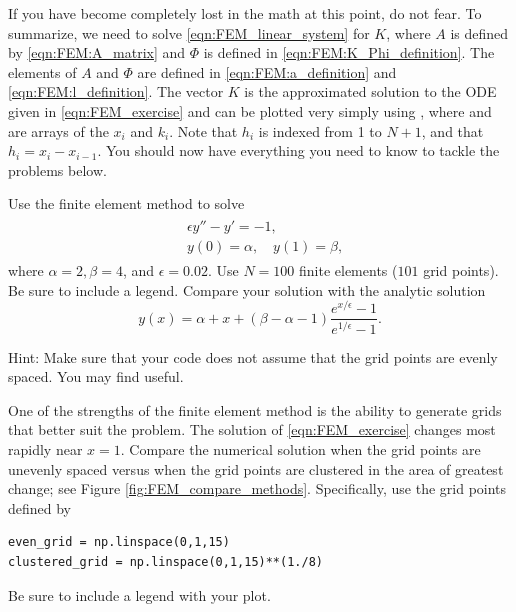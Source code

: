 If you have become completely lost in the math at this point, do not fear.
To summarize, we need to solve \ref{eqn:FEM_linear_system} for $K$, where $A$ is defined by \ref{eqn:FEM:A_matrix} and $\Phi$ is defined in \ref{eqn:FEM:K_Phi_definition}.
The elements of $A$ and $\Phi$ are defined in \ref{eqn:FEM:a_definition} and \ref{eqn:FEM:l_definition}.
The vector $K$ is the approximated solution to the ODE given in \ref{eqn:FEM_exercise} and can be plotted very simply using , where  and  are arrays of the \(x_i\) and \(k_i\).
Note that $h_i$ is indexed from 1 to $N+1$, and that $h_i=x_i-x_{i-1}$.
You should now have everything you need to know to tackle the problems below.


\begin{problem}
Use the finite element method to solve
\begin{align}
	\begin{split}
	&{ }\epsilon y'' - y' = -1,\\
	&{ }y(0) = \alpha, \quad y(1) = \beta,
	\end{split} \label{eqn:FEM_exercise}
\end{align}
where $\alpha = 2, \beta = 4$, and $\epsilon = 0.02$.
Use $N = 100$ finite elements ($101$ grid points).
Be sure to include a legend.
Compare your solution with the analytic solution
\[y(x) = \alpha + x + (\beta - \alpha - 1 ) \frac{e^{x/\epsilon} -1}{e^{1/\epsilon} -1}.\]

Hint: Make sure that your code does not assume that the grid points are evenly spaced.
You may find  useful.
\end{problem}

\begin{problem}
One of the strengths of the finite element method is the ability to generate grids that better suit the problem.
The solution of \eqref{eqn:FEM_exercise} changes most rapidly near $x = 1$.
Compare the numerical solution when the grid points are unevenly spaced versus when the grid points are clustered in the area of greatest change; see Figure \ref{fig:FEM_compare_methods}.
Specifically, use the grid points defined by
\begin{lstlisting}
even_grid = np.linspace(0,1,15)
clustered_grid = np.linspace(0,1,15)**(1./8)
\end{lstlisting}
Be sure to include a legend with your plot.
\end{problem}

